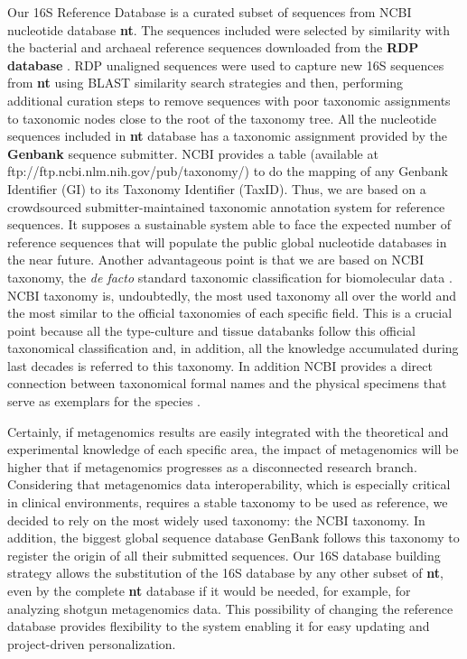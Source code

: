 \documentclass{frontiersSCNS} %
\begin{document}
Our 16S Reference Database is a curated subset of sequences from NCBI
nucleotide database \textbf{nt}. The sequences included were selected by
similarity with the bacterial and archaeal reference sequences
downloaded from the \textbf{RDP database} \citep{cole2013ribosomal}. RDP
unaligned sequences were used to capture new 16S sequences from
\textbf{nt} using BLAST similarity search strategies and then,
performing additional curation steps to remove sequences with poor
taxonomic assignments to taxonomic nodes close to the root of the
taxonomy tree. All the nucleotide sequences included in \textbf{nt}
database has a taxonomic assignment provided by the \textbf{Genbank}
sequence submitter. NCBI provides a table (available at
ftp://ftp.ncbi.nlm.nih.gov/pub/taxonomy/) to do the mapping of any
Genbank Identifier (GI) to its Taxonomy Identifier (TaxID). Thus, we are
based on a crowdsourced submitter-maintained taxonomic annotation system
for reference sequences. It supposes a sustainable system able to face
the expected number of reference sequences that will populate the public
global nucleotide databases in the near future. Another advantageous
point is that we are based on NCBI taxonomy, the \emph{de facto}
standard taxonomic classification for biomolecular data
\citep{cochrane20102010}. NCBI taxonomy is, undoubtedly, the most used
taxonomy all over the world and the most similar to the official
taxonomies of each specific field. This is a crucial point because all
the type-culture and tissue databanks follow this official taxonomical
classification and, in addition, all the knowledge accumulated during
last decades is referred to this taxonomy. In addition NCBI provides a
direct connection between taxonomical formal names and the physical
specimens that serve as exemplars for the species
\citep{federhen2014type}.

Certainly, if metagenomics results are easily integrated with the
theoretical and experimental knowledge of each specific area, the impact
of metagenomics will be higher that if metagenomics progresses as a
disconnected research branch. Considering that metagenomics data
interoperability, which is especially critical in clinical environments,
requires a stable taxonomy to be used as reference, we decided to rely
on the most widely used taxonomy: the NCBI taxonomy. In addition, the
biggest global sequence database GenBank follows this taxonomy to
register the origin of all their submitted sequences. Our 16S database
building strategy allows the substitution of the 16S database by any
other subset of \textbf{nt}, even by the complete \textbf{nt} database
if it would be needed, for example, for analyzing shotgun metagenomics
data. This possibility of changing the reference database provides
flexibility to the system enabling it for easy updating and
project-driven personalization.
\end{document}
